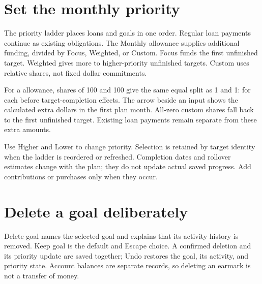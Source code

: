 \section{Set the monthly priority}
The priority ladder places loans and goals in one order. Regular loan payments continue as existing obligations. The Monthly allowance supplies additional funding, divided by Focus, Weighted, or Custom. Focus funds the first unfinished target. Weighted gives more to higher-priority unfinished targets. Custom uses relative shares, not fixed dollar commitments.

For a  allowance, shares of 100 and 100 give the same equal split as 1 and 1:  for each before target-completion effects. The arrow beside an input shows the calculated extra dollars in the first plan month. All-zero custom shares fall back to the first unfinished target. Existing loan payments remain separate from these extra amounts.

Use Higher and Lower to change priority. Selection is retained by target identity when the ladder is reordered or refreshed. Completion dates and rollover estimates change with the plan; they do not update actual saved progress. Add contributions or purchases only when they occur.

\section{Delete a goal deliberately}
Delete goal names the selected goal and explains that its activity history is removed. Keep goal is the default and Escape choice. A confirmed deletion and its priority update are saved together; Undo restores the goal, its activity, and priority state. Account balances are separate records, so deleting an earmark is not a transfer of money.


